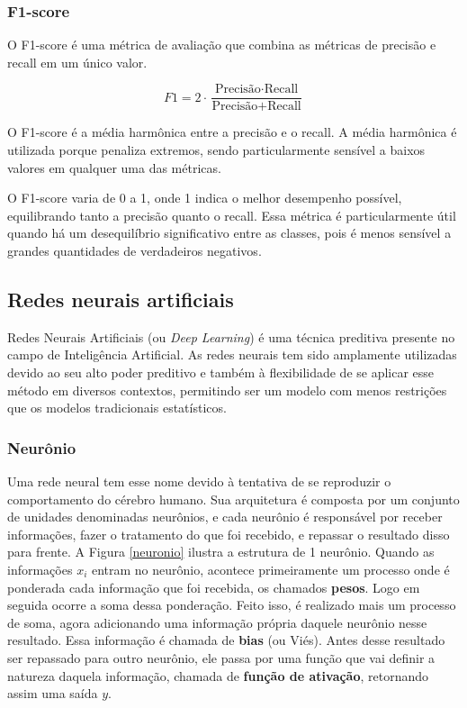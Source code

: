 \subsubsection{F1-score}

O F1-score é uma métrica de avaliação que combina as métricas de precisão e recall em um único valor. 

\begin{equation}
  F1 = 2 \cdot \frac{\text{Precisão} \cdot \text{Recall}}{\text{Precisão} + \text{Recall}}
\end{equation}

O F1-score é a média harmônica entre a precisão e o recall. A média harmônica é utilizada porque penaliza extremos, 
sendo particularmente sensível a baixos valores em qualquer uma das métricas.

O F1-score varia de 0 a 1, onde 1 indica o melhor desempenho possível, equilibrando tanto a precisão quanto o recall.
Essa métrica é particularmente útil quando há um desequilíbrio significativo entre as classes, 
pois é menos sensível a grandes quantidades de verdadeiros negativos.


\subsection{Redes neurais artificiais}

Redes Neurais Artificiais (ou \textit{Deep Learning}) é uma técnica preditiva presente no campo de Inteligência Artificial. As redes neurais tem sido amplamente utilizadas devido ao seu alto poder preditivo e também à flexibilidade de se aplicar esse método em diversos contextos, permitindo ser um modelo com menos restrições que os modelos tradicionais estatísticos.


\subsubsection{Neurônio}

Uma rede neural tem esse nome devido à tentativa de se reproduzir o comportamento do cérebro humano. Sua arquitetura é composta por um conjunto de unidades denominadas neurônios, e cada neurônio é responsável por receber informações, fazer o tratamento do que foi recebido, e repassar o resultado disso para frente. A Figura \ref{neuronio} ilustra a estrutura de 1 neurônio. Quando as informações $x_i$ entram no neurônio, acontece primeiramente um processo onde é ponderada cada informação que foi recebida, os chamados \textbf{pesos}. Logo em seguida ocorre a soma dessa ponderação. Feito isso, é realizado mais um processo de soma, agora adicionando uma informação própria daquele neurônio nesse resultado. Essa informação é chamada de \textbf{bias} (ou Viés). Antes desse resultado ser repassado para outro neurônio, ele passa por uma função que vai definir a natureza daquela informação, chamada de \textbf{função de ativação}, retornando assim uma saída $y$.

